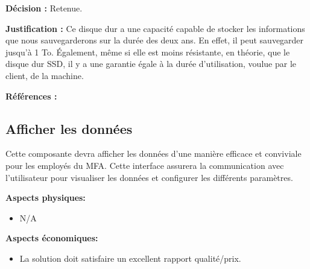 \textbf{Décision :} Retenue.

\textbf{Justification :} Ce disque dur a une capacité capable de stocker les informations que nous sauvegarderons sur la durée des deux ans. En effet, il peut sauvegarder jusqu’à 1 To. Également, même si elle est moins résistante, en théorie, que le disque dur SSD, il y a une garantie égale à la durée d’utilisation, voulue par le client, de la machine.

\textbf{Références :} \cite{HDD1} \cite{HDD2}

\begin{table}[!htb]
\footnotesize
\centering
{}
\caption{Évaluation globales des concepts pour le stockage de données}
\label{t:Decision_stockage}
\end{table}



\subsection{Afficher les données}
Cette composante devra afficher les données d'une manière efficace et conviviale pour les employés du MFA. Cette interface assurera la communication avec l'utilisateur pour visualiser les données et configurer les différents paramètres. \vspace{5mm}

\textbf{Aspects physiques:}
\begin{itemize} [label = {--}]
    \item N/A
\end{itemize}

\textbf{Aspects économiques:}
\begin{itemize} [label = {--}]
    \item La solution doit satisfaire un excellent rapport qualité/prix.
\end{itemize}

